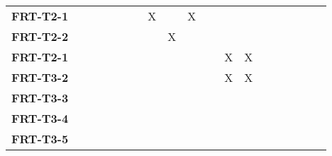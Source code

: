 \documentclass[12pt, titlepage]{article}
\begin{document}
\begin{landscape}
\begin{longtable}{|l|cccccccccccccccc|}
            \textbf{FRT-T2-1}  & ~                                                         & ~            & ~            & ~            & X            & ~            & X            & ~            & ~            & ~             \\
            \textbf{FRT-T2-2}  & ~                                                         & ~            & ~            & ~            & ~            & X            & ~            & ~            & ~            & ~             \\
            \textbf{FRT-T2-1}  & ~                                                         & ~            & ~            & ~            & ~            & ~            & ~            & ~            & X            & X             \\     
            \textbf{FRT-T3-2}  & ~                                                         & ~            & ~            & ~            & ~            & ~            & ~            & ~            & X            & X             \\     
            \textbf{FRT-T3-3}  & ~                                                         & ~            & ~            & ~            & ~            & ~            & ~            & ~            & ~            & ~             \\     
            \textbf{FRT-T3-4}  & ~                                                         & ~            & ~            & ~            & ~            & ~            & ~            & ~            & ~            & ~             \\     
            \textbf{FRT-T3-5}  & ~                                                         & ~            & ~            & ~            & ~            & ~            & ~            & ~            & ~            & ~             \\     
			\hline
		\end{longtable}


\end{landscape}
\end{document}
